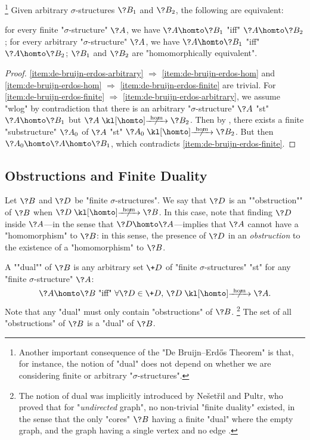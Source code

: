 \begin{corollary}
	\!\footnote{Another important consequence of the "De Bruijn–Erdős Theorem" is that,
	for instance, the notion of "dual" does not depend on whether we are considering finite or
	arbitrary "$\sigma$-structures".}
	\AP\label{coro:de-bruijn-erdos}
	Given arbitrary $\sigma$-structures $\?B_1$ and $\?B_2$, the following are equivalent:
	\begin{enumerate}
		\itemAP\label{item:de-bruijn-erdos-finite} for every finite "$\sigma$-structure" $\?A$, we have $\?A \homto \?B_1$
		"iff" $\?A \homto \?B_2$;
		\itemAP\label{item:de-bruijn-erdos-arbitrary} for every arbitrary "$\sigma$-structure" $\?A$, we have $\?A \homto \?B_1$
			"iff" $\?A \homto \?B_2$;
		\itemAP\label{item:de-bruijn-erdos-hom} $\?B_1$ and $\?B_2$ are "homomorphically equivalent".
	\end{enumerate}
\end{corollary}
\begin{proof}
	\eqref{item:de-bruijn-erdos-arbitrary} $\Rightarrow$ \eqref{item:de-bruijn-erdos-hom}
	and \eqref{item:de-bruijn-erdos-hom} $\Rightarrow$ \eqref{item:de-bruijn-erdos-finite}
	are trivial.
	For \eqref{item:de-bruijn-erdos-finite} $\Rightarrow$ \eqref{item:de-bruijn-erdos-arbitrary},
	we assume "wlog" by contradiction that there is an arbitrary "$\sigma$-structure" $\?A$ "st" $\?A \homto \?B_1$ but $\?A \nothomto \?B_2$. Then by ,
	there exists a finite "substructure" $\?A_0$ of $\?A$ "st" $\?A_0 \nothomto \?B_2$.
	But then $\?A_0 \homto \?A \homto \?B_1$, which contradicts \eqref{item:de-bruijn-erdos-finite}.
\end{proof}


\subsection{Obstructions and Finite Duality}

Let $\?B$ and $\?D$ be "finite $\sigma$-structures".
We say that $\?D$ is an \AP""obstruction"" of $\?B$ when $\?D \nothomto \?B$.
In this case, note that finding $\?D$ inside $\?A$---in the sense that $\?D \homto \?A$---implies that $\?A$ cannot have a "homomorphism" to $\?B$: in this sense, the presence of
$\?D$ in an \emph{obstruction} to the existence of a "homomorphism" to $\?B$.

A \AP""dual"" of $\?B$ is any arbitrary set $\+D$ of "finite $\sigma$-structures" "st"
for any "finite $\sigma$-structure" $\?A$:
\[
	\?A \homto \?B
	\text{ "iff" }
	\forall \?D \in \+D,\, \?D \nothomto \?A.
\]
Note that any "dual" must only contain "obstructions" of $\?B$.%
\footnote{The notion of dual was implicitly introduced
by Ne\v{s}et\v{r}il and Pultr, who proved that for "\emph{undirected} graph", no
non-trivial "finite duality" existed, in the sense that the
only "cores" $\?B$ having a finite "dual" where the empty graph, and the graph having
a single vertex and no edge \cite[Corollary 4.1]{NesetrilPultr1978Duality}.}
The set of all "obstructions" of $\?B$ is a "dual" of $\?B$.


